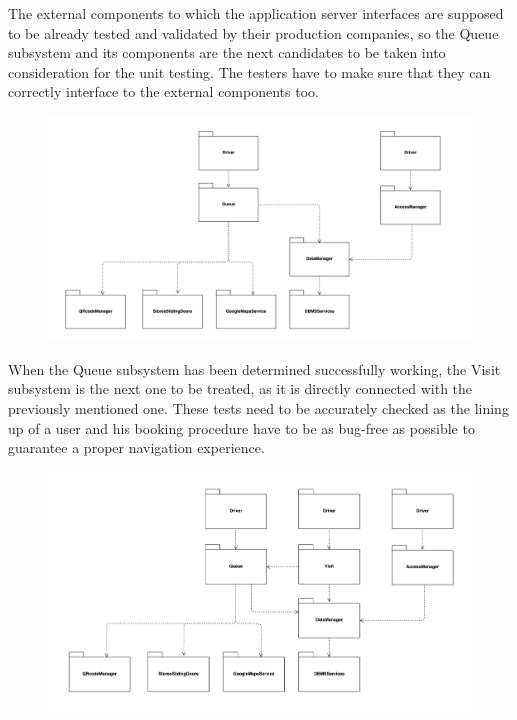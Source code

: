 \documentclass[]{article}
\begin{document}
\noindent
The external components to which the application server interfaces are supposed to be already tested and validated by their production companies, so the Queue subsystem and its components are the next candidates to be taken into consideration for the unit testing. The testers have to make sure that they can correctly interface to the external components too.
				\begin{figure}[H]
					\centering
					\includegraphics[scale=0.55]{Testing/Testing3.png}
					\caption{}
					\label{fig:Testing}
				\end{figure}
\noindent
When the Queue subsystem has been determined successfully working, the Visit subsystem is the next one to be treated, as it is directly connected with the previously mentioned one. These tests need to be accurately checked as the lining up of a user and his booking procedure have to be as bug-free as possible to guarantee a proper navigation experience.
				\begin{figure}[H]
					\centering
					\includegraphics[scale=0.5]{Testing/Testing4.png}
					\caption{}
					\label{fig:Testing}
				\end{figure}
\end{document}

